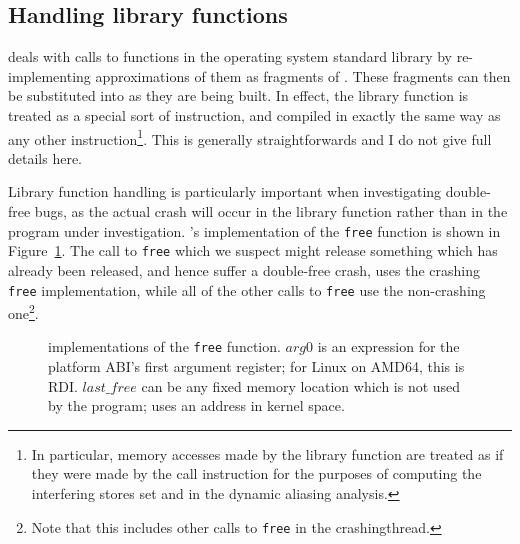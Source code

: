 \subsection{Handling library functions}
\label{sect:derive:library_functions}

{\Implementation} deals with calls to functions in the operating
system standard library by re-implementing approximations of them as
fragments of {\StateMachine}.  These fragments can then be substituted
into {\StateMachines} as they are being built.  In effect, the library
function is treated as a special sort of instruction, and compiled in
exactly the same way as any other instruction\footnote{In particular,
  memory accesses made by the library function are treated as if they
  were made by the call instruction for the purposes of computing the
  interfering stores set and in the dynamic aliasing analysis.}.  This
is generally straightforwards and I do not give full details here.

Library function handling is particularly important when investigating
double-free bugs, as the actual crash will occur in the library
function rather than in the program under investigation.
{\Technique}'s implementation of the \texttt{free} function is shown
in Figure~\ref{fig:library_free}.  The call to \texttt{free} which we
suspect might release something which has already been released, and
hence suffer a double-free crash, uses the crashing \texttt{free}
implementation, while all of the other calls to \texttt{free} use the
non-crashing one\footnote{Note that this includes other calls to
  \texttt{free} in the \gls{crashingthread}.}.

\begin{figure}

  \caption{{\StateMachine} implementations of the \texttt{free}
    function. $arg0$ is an expression for the platform ABI's first
    argument register; for Linux on AMD64, this is RDI.
    $\mathit{last\_free}$ can be any fixed memory location which is
    not used by the program; {\implementation} uses an address in
    kernel space.}
  \label{fig:library_free}
\end{figure}

